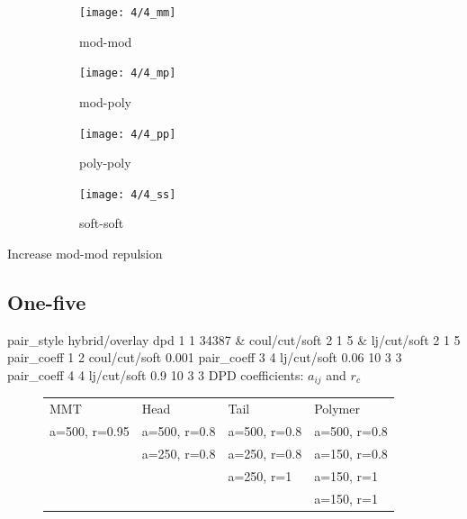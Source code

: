 \documentclass[a4paper]{article}
\begin{document}
\begin{figure}[H]
\begin{subfigure}{0.24\textwidth}
  \centering
  \texttt{[image: 4/4\_mm]}
  \caption{mod-mod}
\end{subfigure}
\begin{subfigure}{0.24\textwidth}
  \centering
  \texttt{[image: 4/4\_mp]}
  \caption{mod-poly}
\end{subfigure}
\begin{subfigure}{0.24\textwidth}
  \centering
  \texttt{[image: 4/4\_pp]}
  \caption{poly-poly}
\end{subfigure}
\begin{subfigure}{0.24\textwidth}
  \centering
  \texttt{[image: 4/4\_ss]}
  \caption{soft-soft}
\end{subfigure}
\caption{}
\label{fig_1}
\end{figure}
Increase mod-mod repulsion


\subsection*{One-five}
pair\_style hybrid/overlay dpd 1 1 34387 \& coul/cut/soft 2 1 5 \& 
lj/cut/soft 2 1 5\newline
pair\_coeff 1 2 coul/cut/soft 0.001\newline
pair\_coeff 3 4 lj/cut/soft 0.06    10 3 3\newline
pair\_coeff 4 4 lj/cut/soft 0.9     10 3 3\newline
DPD coefficients: $a_{ij}$ and $r_c$
\begin{figure}[H]\begin{tabular}{llll}
MMT           & Head         & Tail         & Polymer      \\
a=500, r=0.95 & a=500, r=0.8 & a=500, r=0.8 & a=500, r=0.8 \\
              & a=250, r=0.8 & a=250, r=0.8 & a=150, r=0.8 \\
              &              & a=250, r=1   & a=150, r=1   \\
              &              &              & a=150, r=1   \\
\end{tabular}\end{figure}
\end{document}

